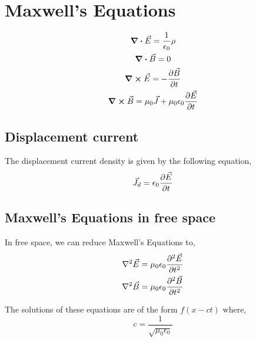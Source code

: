 \documentclass[12pt, oneside]{book}
\begin{document}
\section{Maxwell's Equations}
\begin{tcolorbox}[colback=yellow!5!white,colframe=yellow!50!black]
	\begin{gather}
		\div \vec E = \frac{1}{\epsilon_0} \rho \\
		\div \vec B = 0 \\
		\curl \vec E = - \pdv{\vec B}{t} \\
		\curl \vec B = \mu_0 \vec J + \mu_0 \epsilon_0 \pdv{\vec E}{t}
	\end{gather}
\end{tcolorbox}

\subsection{Displacement current}
The displacement current density is given by the following equation,
\begin{equation}
	\vec J_d = \epsilon_0 \pdv{\vec E}{t}
\end{equation}

\subsection{Maxwell's Equations in free space}
In free space, we can reduce Maxwell's Equations to,
\begin{gather}
	\laplacian \vec E = \mu_0 \epsilon_0 \pdv[2]{\vec E}{t}\\
	\laplacian \vec B = \mu_0 \epsilon_0 \pdv[2]{\vec B}{t}\\
\end{gather}

The solutions of these equations are of the form $f(x-ct)$ where,
\begin{equation}
	c = \frac{1}{\sqrt{\mu_0\epsilon_0}}
\end{equation}
\end{document}
